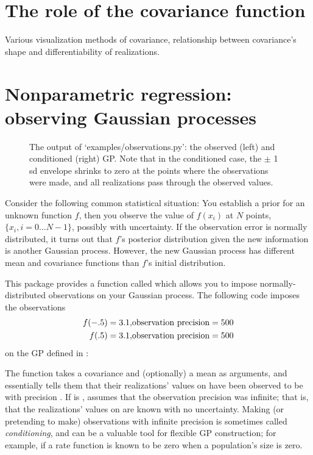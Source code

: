 \documentclass{manual}
\begin{document}


\section{The role of the covariance function}\label{sec:cov} %

Various visualization methods of covariance, relationship between covariance's shape and differentiability of realizations.



\section{Nonparametric regression: observing Gaussian processes}\label{sec:observing} %

\begin{figure}
	\centering
	\caption{The output of {\sffamily `examples/observations.py'}: the observed (left) and conditioned (right) GP. Note that in the conditioned case, the $\pm$ 1 sd envelope shrinks to zero at the points where the observations were made, and all realizations pass through the observed values.}
	\label{fig:obs}
\end{figure}

Consider the following common statistical situation: You establish a prior for an unknown function $f$, then you observe the value of $f(x_i)$ at $N$ points, $\{x_i, i=0\ldots N-1\}$, possibly with uncertainty. If the observation error is normally distributed, it turns out that $f$'s posterior distribution given the new information is another Gaussian process. However, the new Gaussian process has different mean and covariance functions than $f$'s initial distribution.

This package provides a function called  which allows you to impose normally-distributed observations on your Gaussian process. The following code imposes the observations
\begin{eqnarray}
	f(-.5) = 3.1, & \textup{observation precision}=500\\
	f(.5) = 3.1, & \textup{observation precision}=500
\end{eqnarray}
on the GP defined in :
 

The function  takes a covariance   and (optionally) a mean  as arguments, and essentially tells them that their realizations' values on  have been observed to be  with precision . If  is ,  assumes that the observation precision was infinite; that is, that the realizations' values on  are known with no uncertainty. Making (or pretending to make) observations with infinite precision is sometimes called \emph{conditioning}, and can be a valuable tool for flexible GP construction; for example, if a rate function is known to be zero when a population's size is zero.
\end{document}
